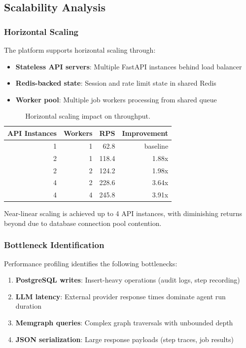 \subsection{Scalability Analysis}

\subsubsection{Horizontal Scaling}

The platform supports horizontal scaling through:

\begin{itemize}
    \item \textbf{Stateless API servers}: Multiple FastAPI instances behind load balancer
    \item \textbf{Redis-backed state}: Session and rate limit state in shared Redis
    \item \textbf{Worker pool}: Multiple job workers processing from shared queue
\end{itemize}

\begin{table}[ht]
\centering
\caption{Horizontal scaling impact on throughput.}
\label{tab:horizontal-scaling}
\small
\begin{tabular}{rrrr}
\hline
\textbf{API Instances} & \textbf{Workers} & \textbf{RPS} & \textbf{Improvement} \\
\hline
1 & 1 & 62.8 & baseline \\
2 & 1 & 118.4 & 1.88x \\
2 & 2 & 124.2 & 1.98x \\
4 & 2 & 228.6 & 3.64x \\
4 & 4 & 245.8 & 3.91x \\
\hline
\end{tabular}
\end{table}

Near-linear scaling is achieved up to 4 API instances, with diminishing returns beyond due to database connection pool contention.

\subsubsection{Bottleneck Identification}

Performance profiling identifies the following bottlenecks:

\begin{enumerate}
    \item \textbf{PostgreSQL writes}: Insert-heavy operations (audit logs, step recording)
    \item \textbf{LLM latency}: External provider response times dominate agent run duration
    \item \textbf{Memgraph queries}: Complex graph traversals with unbounded depth
    \item \textbf{JSON serialization}: Large response payloads (step traces, job results)
\end{enumerate}

